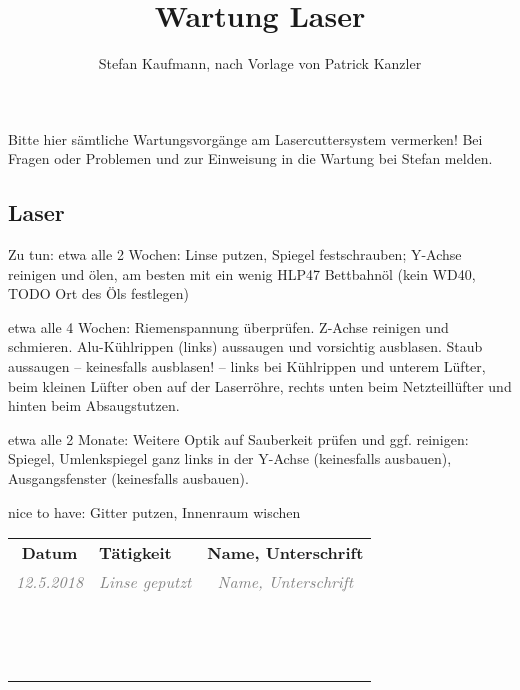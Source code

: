 \documentclass{\basedir/tph-document}
\title{Wartung Laser}
\author{Stefan Kaufmann, nach Vorlage von Patrick Kanzler}
\newcommand{\thickhline}{\noalign{\hrule height 2pt}}
\begin{document}
Bitte hier sämtliche Wartungsvorgänge am Lasercuttersystem vermerken!
Bei Fragen oder Problemen und zur Einweisung in die Wartung bei Stefan melden.
\vspace{-1.5em}
\subsection*{Laser}
\vspace{-1em}
Zu tun: etwa alle 2 Wochen: Linse putzen, Spiegel festschrauben;  Y-Achse reinigen und ölen, am besten mit ein wenig HLP47 Bettbahnöl (kein WD40, TODO Ort des Öls festlegen)

etwa alle 4 Wochen: Riemenspannung überprüfen. Z-Achse reinigen und schmieren. Alu-Kühlrippen (links) aussaugen und vorsichtig ausblasen. Staub aussaugen -- keinesfalls ausblasen! -- links bei Kühlrippen und unterem Lüfter, beim kleinen Lüfter oben auf der Laserröhre, rechts unten beim Netzteillüfter und hinten beim Absaugstutzen.

etwa alle 2 Monate: Weitere Optik auf Sauberkeit prüfen und ggf. reinigen: Spiegel, Umlenkspiegel ganz links in der Y-Achse (keinesfalls ausbauen), Ausgangsfenster (keinesfalls ausbauen).

nice to have: Gitter putzen, Innenraum wischen


\newcommand{\bsp}[1]{\textcolor{gray}{\itshape #1}}
\newcommand{\beispielzeile}[5]{\bsp{#2} & \bsp{#3} & \bsp{#4} \\ \hline}
\newcommand{\leerzeile}{\vbox{\vspace{2.4em}} & & \\ \hline}
\vspace{-.4em}
\begin{tabularx}{\textwidth}{|c|X|c|} \hline
\bfseries Datum      &  \bfseries Tätigkeit  & \bfseries Name, Unterschrift \\\thickhline
\beispielzeile{BSP}{12.5.2018}{ Linse geputzt }{Name, Unterschrift}
\leerzeile
\leerzeile
\leerzeile
\leerzeile
\leerzeile
\leerzeile
\leerzeile
\leerzeile
\leerzeile
\leerzeile
\leerzeile
\leerzeile
\leerzeile
\leerzeile
\leerzeile
\end{tabularx}
\end{document}
